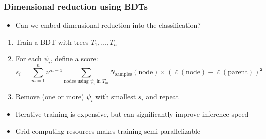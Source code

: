 \documentclass[aspectratio=169,xcolor=dvipsnames,,table,compress]{beamer}
\begin{document}
\begin{frame} \frametitle{Dimensional reduction using BDTs}
  \vspace{-5mm}
  \begin{itemize}
    \item Can we embed dimensional reduction into the classification?
  \end{itemize}
  \begin{enumerate}
    \item Train a BDT with trees $T_1,\dots,T_n$
    \item For each $\psi_i$, define a score:
    \[ s_i = \sum_{m=1}^n \nu^{m-1} \sum_{\text{nodes using $\psi_i$ in $T_m$}} N_\text{samples}(\mathrm{node}) \times \left(\ell(\mathrm{node}) - \ell(\mathrm{parent})\right)^2  \]
    \item Remove (one or more) $\psi_i$ with smallest $s_i$ and repeat
  \end{enumerate}
  \begin{itemize}
    \item Iterative training is expensive, but can significantly improve inference speed
    \item Grid computing resources makes training semi-parallelizable
  \end{itemize}
\end{frame}
\end{document}
